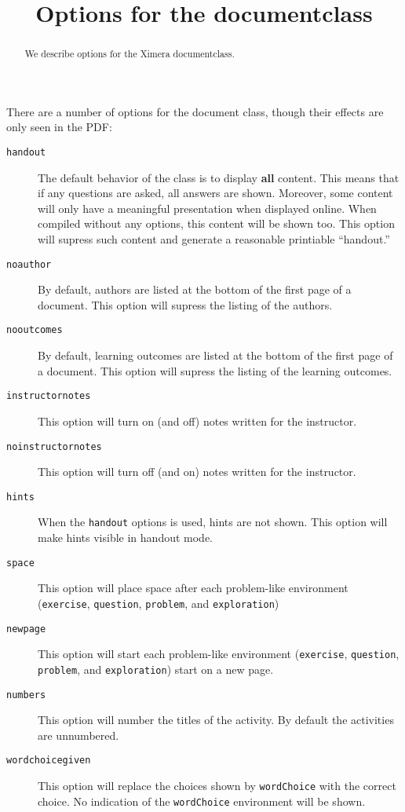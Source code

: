 \documentclass{ximera}
\title{Options for the documentclass}
\begin{document}
\begin{abstract}
  We describe options for the Ximera documentclass. 
\end{abstract}
\maketitle

There are a number of options for the document class, though their
effects are only seen in the PDF:

\begin{description}
\item[\texttt{handout}] The default behavior of the class is to display \textbf{all} content. This means that if any questions are asked, all answers are shown. Moreover, some content will only have a meaningful presentation when displayed online. When compiled without any options, this content will be shown too. This option will supress such content and generate a reasonable printiable ``handout.''
\item[\texttt{noauthor}] By default, authors are listed at the bottom of the first page of a document. This option will supress the listing of the authors.
\item[\texttt{nooutcomes}] By default, learning outcomes are listed at the bottom of the first page of a document. This option will supress the listing of the learning outcomes.
\item[\texttt{instructornotes}] This option will turn on (and off) notes written for the instructor.
\item[\texttt{noinstructornotes}] This option will turn off (and on) notes written for the instructor.
\item[\texttt{hints}] When the \texttt{handout} options is used, hints are not shown. This option will make hints visible in handout mode.
\item[\texttt{space}] This option will place space after each problem-like environment (\texttt{exercise}, \texttt{question}, \texttt{problem}, and \texttt{exploration})
\item[\texttt{newpage}] This option will start each problem-like environment (\texttt{exercise}, \texttt{question}, \texttt{problem}, and \texttt{exploration}) start on a new page.
\item[\texttt{numbers}] This option will number the titles of the activity. By default the activities are unnumbered.
\item[\texttt{wordchoicegiven}] This option will replace the choices shown by \texttt{wordChoice} with the correct choice. No indication of the \texttt{wordChoice} environment will be shown.
\end{description}
\end{document}
